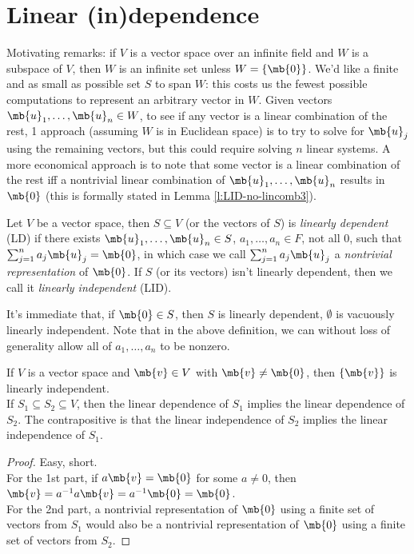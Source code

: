 \section{Linear (in)dependence}
Motivating remarks: if $V$ is a vector space over an infinite field and $W$ is a subspace of $V$, then $W$ is an infinite set unless $W= \{ \mb{0}\}$. We'd like a finite and as small as possible set $S$ to span $W$: this costs us the fewest possible computations to represent an arbitrary vector in $W$.
Given vectors $\mb{u}_1, \ldots, \mb{u}_n \in W$, to see if any vector is a linear combination of the rest, 1 approach (assuming $W$ is in Euclidean space) is to try to solve for $\mb{u}_j$ using the remaining vectors, but this could require solving $n$ linear systems.
A more economical approach is to note that some vector is a linear combination of the rest iff a nontrivial linear combination of $\mb{u}_1, \ldots, \mb{u}_n$ results in $\mb{0}$ (this is formally stated in Lemma \ref{l:LID-no-lincomb3}).
\begin{defn}
Let $V$ be a vector space, then $S \subseteq V$ (or the vectors of $S$) is \emph{linearly dependent} (LD) if there exists $\mb{u}_1, \ldots, \mb{u}_n \in S$, $a_1, \ldots,a_n \in F$, not all 0, such that $\sum_{j=1}^na_j \mb{u}_j= \mb{0}$, in which case we call $\sum_{j=1}^na_j \mb{u}_j$ a \emph{nontrivial representation} of $\mb{0}$. If $S$ (or its vectors) isn't linearly dependent, then we call it \emph{linearly independent} (LID).
\end{defn}
It's immediate that, if $\mb{0}\in S$, then $S$ is linearly dependent, $\emptyset$ is vacuously linearly independent. Note that in the above definition, we can without loss of generality allow all of $a_1, \ldots,a_n$ to be nonzero.
\begin{lem}\label{l:subset-LID}
If $V$ is a vector space and $\mb{v}\in V$ with $\mb{v}\neq \mb{0}$, then $\{ \mb{v}\}$ is linearly independent.\\
If $S_1 \subseteq S_2 \subseteq V$, then the linear dependence of $S_1$ implies the linear dependence of $S_2$. The contrapositive is that the linear independence of $S_2$ implies the linear independence of $S_1$.
\end{lem}
\begin{proof}
Easy, short.\\
For the 1st part, if $a \mb{v}= \mb{0}$ for some $a \neq 0$, then $\mb{v}=a^{-1}a \mb{v}=a^{-1}\mb{0}= \mb{0}$.\\
For the 2nd part, a nontrivial representation of $\mb{0}$ using a finite set of vectors from $S_1$ would also be a nontrivial representation of $\mb{0}$ using a finite set of vectors from $S_2$.
\end{proof}
